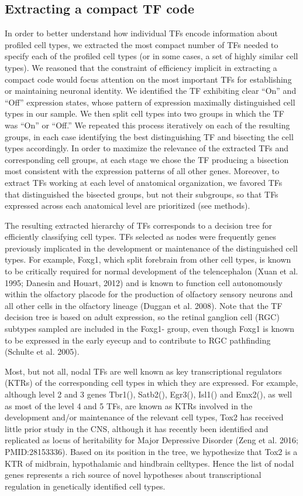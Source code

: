 \subsection{Extracting a compact TF code}
In order to better understand how individual TFs encode information about profiled cell types, we extracted the most compact number of TFs needed to specify each of the profiled cell types (or in some cases, a set of highly similar cell types). We reasoned that the constraint of efficiency implicit in extracting a compact code would focus attention on the most important TFs for establishing or maintaining neuronal identity. We identified the TF exhibiting clear “On” and “Off” expression states, whose pattern of expression maximally distinguished cell types in our sample. We then split cell types into two groups in which the TF was “On” or “Off.” We repeated this process iteratively on each of the resulting groups, in each case identifying the best distinguishing TF and bisecting the cell types accordingly. In order to maximize the relevance of the extracted TFs and corresponding cell groups, at each stage we chose the TF producing a bisection most consistent with the expression patterns of all other genes. Moreover, to extract TFs working at each level of anatomical organization, we favored TFs that distinguished the bisected groups, but not their subgroups, so that TFs expressed across each anatomical level are prioritized (see methods).

The resulting extracted hierarchy of TFs corresponds to a decision tree \cite{Saeys_2007} for efficiently classifying cell types\cite{Gabitto_2016}.
TFs selected as nodes were frequently genes previously implicated in the development or maintenance of the distinguished cell types. For example, Foxg1, which split forebrain from other cell types, is known to be critically required for normal development of the telencephalon (Xuan et al. 1995; Danesin and Houart, 2012) and is known to function cell autonomously within the olfactory placode for the production of olfactory sensory neurons and all other cells in the olfactory lineage (Duggan et al. 2008). Note that the TF decision tree is based on adult expression, so the retinal ganglion cell (RGC) subtypes sampled are included in the Foxg1- group, even though Foxg1 is known to be expressed in the early eyecup and to contribute to RGC pathfinding (Schulte et al. 2005).

Most, but not all, nodal TFs are well known as key transcriptional regulators (KTRs) of the corresponding cell types in which they are expressed. For example, although level 2 and 3 genes Tbr1(), Satb2(), Egr3(), Isl1() and Emx2(), as well as most of the level 4 and 5 TFs, are known as KTRs involved in the development and/or maintenance of the relevant cell types, Tox2 has received little prior study in the CNS, although it has recently been identified and replicated as locus of heritability for Major Depressive Disorder (Zeng et al. 2016; PMID:28153336). Based on its position in the tree, we hypothesize that Tox2 is a KTR of midbrain, hypothalamic and hindbrain celltypes. Hence the list of nodal genes represents a rich source of novel hypotheses about transcriptional regulation in genetically identified cell types.

